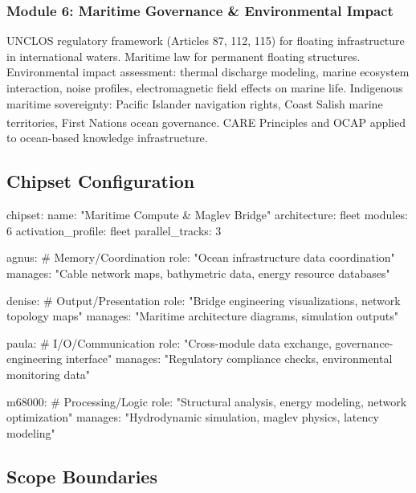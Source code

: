\documentclass[11pt,letterpaper]{article}
\begin{document}
\subsubsection{Module 6: Maritime Governance \& Environmental Impact}

UNCLOS regulatory framework (Articles 87, 112, 115) for floating infrastructure in international waters. Maritime law for permanent floating structures. Environmental impact assessment: thermal discharge modeling, marine ecosystem interaction, noise profiles, electromagnetic field effects on marine life. Indigenous maritime sovereignty: Pacific Islander navigation rights, Coast Salish marine territories, First Nations ocean governance. CARE Principles and OCAP\textsuperscript{\textregistered} applied to ocean-based knowledge infrastructure.

\subsection{Chipset Configuration}

\begin{asciibox}
chipset:
  name: "Maritime Compute & Maglev Bridge"
  architecture: fleet
  modules: 6
  activation_profile: fleet
  parallel_tracks: 3

  agnus:  # Memory/Coordination
    role: "Ocean infrastructure data coordination"
    manages: "Cable network maps, bathymetric data, energy resource databases"

  denise:  # Output/Presentation
    role: "Bridge engineering visualizations, network topology maps"
    manages: "Maritime architecture diagrams, simulation outputs"

  paula:  # I/O/Communication
    role: "Cross-module data exchange, governance-engineering interface"
    manages: "Regulatory compliance checks, environmental monitoring data"

  m68000:  # Processing/Logic
    role: "Structural analysis, energy modeling, network optimization"
    manages: "Hydrodynamic simulation, maglev physics, latency modeling"
\end{asciibox}

\subsection{Scope Boundaries}
\end{document}
